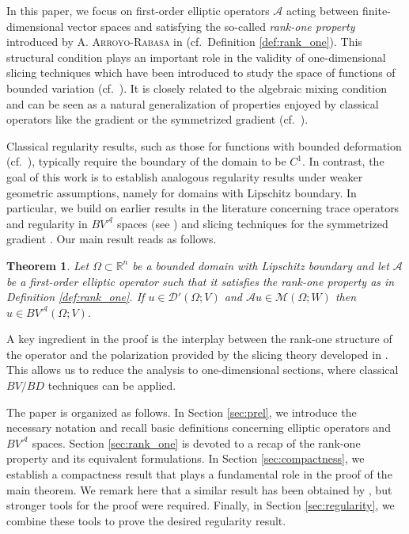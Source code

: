 \documentclass[11pt,reqno]{amsart}
\theoremstyle{plain}
\newtheorem{theorem}{Theorem}[section]
\theoremstyle{definition}
\theoremstyle{remark}
\numberwithin{equation}{section}
\newcommand{\R}{\mathbb{R}}
\newcommand{\M}{\mathcal{M}}
\newcommand{\A}{\mathcal{A}}
\newcommand{\D}{\mathcal{D}}
\newcommand{\1}{\mathbbm{1}} %
\begin{document}
In this paper, we focus on first-order elliptic operators $\mathcal{A}$ acting between finite-dimensional vector spaces and satisfying the so-called \emph{rank-one property} introduced by \textsc{A. Arroyo-Rabasa} in \cite{AR20} (cf.\ Definition \ref{def:rank_one}). This structural condition plays an important role in the validity of one-dimensional slicing techniques which have been introduced to study the space of functions of bounded variation (cf.\ \cite{AFP00}). It is closely related to the algebraic mixing condition and can be seen as a natural generalization of properties enjoyed by classical operators like the gradient or the symmetrized gradient (cf.\ \cite{AR20, SVS19}).

Classical regularity results, such as those for functions with bounded deformation (cf.\ \cite[Chapter II, Theorem 2.3]{temam}), typically require the boundary of the domain to be $C^1$. In contrast, the goal of this work is to establish analogous regularity results under weaker geometric assumptions, namely for domains with Lipschitz boundary. In particular, we build on earlier results in the literature concerning trace operators and regularity in $BV^{\A}$ spaces (see \cite{BDG20}) and slicing techniques for the symmetrized gradient \cite{DM13, AR20}. Our main result reads as follows.

\begin{theorem}
\label{thm:DR}
    Let $\Omega \subset \R^n$ be a bounded domain with Lipschitz boundary and let $\A$ be a first-order elliptic operator such that it satisfies the rank-one property as in Definition \ref{def:rank_one}. If $u \in \D'(\Omega; V)$ and $\A u \in \M(\Omega; W)$ then $u \in BV^\A(\Omega; V)$.
\end{theorem}

A key ingredient in the proof is the interplay between the rank-one structure of the operator and the polarization provided by the slicing theory developed in \cite{AR20}. This allows us to reduce the analysis to one-dimensional sections, where classical $BV/BD$ techniques can be applied. 

The paper is organized as follows. In Section \ref{sec:prel}, we introduce the necessary notation and recall basic definitions concerning elliptic operators and $BV^{\mathcal{A}}$ spaces. Section \ref{sec:rank_one} is devoted to a recap of the rank-one property and its equivalent formulations. In Section \ref{sec:compactness}, we establish a compactness result that plays a fundamental role in the proof of the main theorem. We remark here that a similar result has been obtained by \cite{GR26}, but stronger tools for the proof were required. Finally, in Section \ref{sec:regularity}, we combine these tools to prove the desired regularity result.
\end{document}
